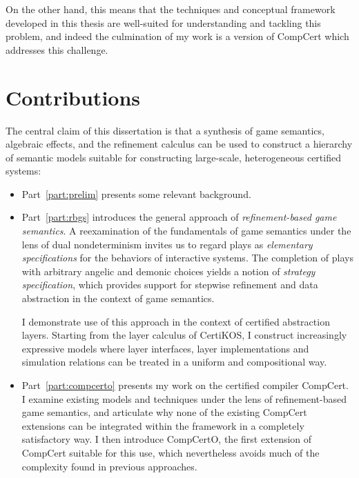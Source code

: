 \documentclass[11pt,oneside]{book}
\theoremstyle{definition}
\begin{document}
On the other hand,
this means that the techniques and conceptual framework
developed in this thesis
are well-suited
for understanding and tackling this problem,
and indeed the culmination of my work
is a version of CompCert
which addresses this challenge.


\section{Contributions} %
\label{ssec:contrib}

The central claim of this dissertation is that a synthesis
of %
game semantics, algebraic effects, and the refinement calculus
can be used to construct a hierarchy of semantic models
suitable for constructing large-scale, heterogeneous certified systems:
\begin{itemize}
  \item
    Part~\ref{part:prelim} presents some relevant background.
  \item
    Part~\ref{part:rbgs}
    introduces the general approach of
    \emph{refinement-based game semantics}.
    A reexamination of the fundamentals of game semantics
    under the lens of dual nondeterminism
    invites us to regard plays as \emph{elementary specifications}
    for the behaviors of interactive systems.
    The completion of plays
    with arbitrary angelic and demonic choices
    yields a notion of \emph{strategy specification},
    which provides support for
    stepwise refinement and data abstraction
    in the context of game semantics.

    I demonstrate use of this approach
    in the context of certified abstraction layers.
    Starting from the layer calculus of CertiKOS,
    I construct increasingly expressive models
    where layer interfaces, layer implementations and
    simulation relations
    can be treated in a uniform and compositional way.
  \item
    Part~\ref{part:compcerto}
    presents my work on the certified compiler CompCert.
    I examine existing models and techniques
    under the lens of refinement-based game semantics,
    and articulate why none of the existing
    CompCert extensions can be integrated within
    the framework in a completely satisfactory way.
    I then introduce CompCertO,
    the first extension of CompCert suitable
    for this use,
    which nevertheless avoids much of the complexity
    found in previous approaches.
\end{itemize}
\end{document}
